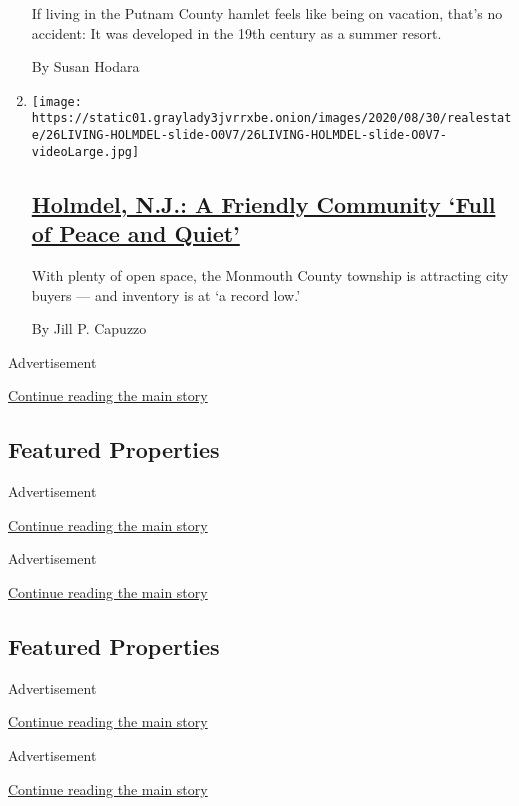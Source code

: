 \begin{enumerate}
  If living in the Putnam County hamlet feels like being on vacation,
  that's no accident: It was developed in the 19th century as a summer
  resort.

  By Susan Hodara
\item
  \texttt{[image: https://static01.graylady3jvrrxbe.onion/images/2020/08/30/realestate/26LIVING-HOLMDEL-slide-O0V7/26LIVING-HOLMDEL-slide-O0V7-videoLarge.jpg]}

  \hypertarget{holmdel-nj-a-friendly-community-full-of-peace-and-quiet}{%
  \subsection{\texorpdfstring{\href{/2020/08/26/realestate/holmdel-nj.html}{Holmdel,
  N.J.: A Friendly Community `Full of Peace and
  Quiet'}}{Holmdel, N.J.: A Friendly Community `Full of Peace and Quiet'}}\label{holmdel-nj-a-friendly-community-full-of-peace-and-quiet}}

  With plenty of open space, the Monmouth County township is attracting
  city buyers --- and inventory is at `a record low.'

  By Jill P. Capuzzo
\end{enumerate}

Advertisement

\protect\hyperlink{after-mid2}{Continue reading the main story}

\hypertarget{featured-properties}{%
\subsection{Featured Properties}\label{featured-properties}}

Advertisement

\protect\hyperlink{after-feat1}{Continue reading the main story}

Advertisement

\protect\hyperlink{after-feat2}{Continue reading the main story}

\hypertarget{featured-properties-1}{%
\subsection{Featured Properties}\label{featured-properties-1}}

Advertisement

\protect\hyperlink{after-feat3}{Continue reading the main story}

Advertisement

\protect\hyperlink{after-feat4}{Continue reading the main story}

